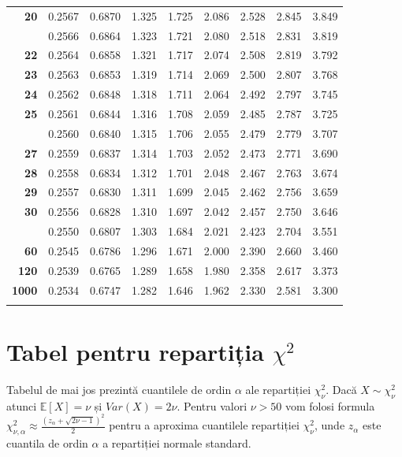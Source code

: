 \documentclass[]{article}
\begin{document}
\begin{longtable}{>{\bfseries}r|rrrrrrrr}
20 & 0.2567 & 0.6870 & 1.325 & 1.725 & 2.086 & 2.528 & 2.845 & 3.849\\
\addlinespace
21 & 0.2566 & 0.6864 & 1.323 & 1.721 & 2.080 & 2.518 & 2.831 & 3.819\\
22 & 0.2564 & 0.6858 & 1.321 & 1.717 & 2.074 & 2.508 & 2.819 & 3.792\\
23 & 0.2563 & 0.6853 & 1.319 & 1.714 & 2.069 & 2.500 & 2.807 & 3.768\\
24 & 0.2562 & 0.6848 & 1.318 & 1.711 & 2.064 & 2.492 & 2.797 & 3.745\\
25 & 0.2561 & 0.6844 & 1.316 & 1.708 & 2.059 & 2.485 & 2.787 & 3.725\\
\addlinespace
26 & 0.2560 & 0.6840 & 1.315 & 1.706 & 2.055 & 2.479 & 2.779 & 3.707\\
27 & 0.2559 & 0.6837 & 1.314 & 1.703 & 2.052 & 2.473 & 2.771 & 3.690\\
28 & 0.2558 & 0.6834 & 1.312 & 1.701 & 2.048 & 2.467 & 2.763 & 3.674\\
29 & 0.2557 & 0.6830 & 1.311 & 1.699 & 2.045 & 2.462 & 2.756 & 3.659\\
30 & 0.2556 & 0.6828 & 1.310 & 1.697 & 2.042 & 2.457 & 2.750 & 3.646\\
\addlinespace
40 & 0.2550 & 0.6807 & 1.303 & 1.684 & 2.021 & 2.423 & 2.704 & 3.551\\
60 & 0.2545 & 0.6786 & 1.296 & 1.671 & 2.000 & 2.390 & 2.660 & 3.460\\
120 & 0.2539 & 0.6765 & 1.289 & 1.658 & 1.980 & 2.358 & 2.617 & 3.373\\
1000 & 0.2534 & 0.6747 & 1.282 & 1.646 & 1.962 & 2.330 & 2.581 & 3.300\\*
\end{longtable}

\endgroup{}

\section{\texorpdfstring{Tabel pentru repartiția
\(\chi^2\)}{Tabel pentru repartiția \chi\^{}2}}\label{tabel-pentru-repartitia-chi2}

Tabelul de mai jos prezintă cuantilele de ordin \(\alpha\) ale
repartiției \(\chi^2_{\nu}\). Dacă \(X\sim \chi^2_{\nu}\) atunci
\(\mathbb{E}[X]=\nu\) și \(Var(X) = 2\nu\). Pentru valori \(\nu>50\) vom
folosi formula
\(\chi^2_{\nu,\alpha} \approx \frac{(z_{\alpha}+\sqrt{2\nu-1})^2}{2}\)
pentru a aproxima cuantilele repartiției \(\chi^2_{\nu}\), unde
\(z_{\alpha}\) este cuantila de ordin \(\alpha\) a repartiției normale
standard.
\end{document}
